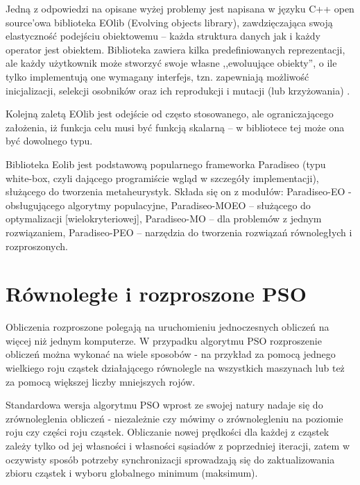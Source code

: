\documentclass[12pt, twoside, openany, abstract=on]{report}
\theoremstyle{definition}
\begin{document}
Jedną z odpowiedzi na opisane wyżej problemy jest napisana w języku C++ open source’owa biblioteka EOlib (Evolving objects library), zawdzięczająca swoją elastyczność podejściu obiektowemu – każda struktura danych jak i każdy operator jest obiektem. Biblioteka zawiera kilka predefiniowanych reprezentacji, ale każdy użytkownik może stworzyć swoje własne ,,ewoluujące obiekty'', o ile tylko implementują one wymagany interfejs, tzn. zapewniają możliwość inicjalizacji, selekcji osobników oraz ich reprodukcji i mutacji (lub krzyżowania) 
. 

Kolejną zaletą EOlib jest odejście od często stosowanego, ale ograniczającego założenia, iż funkcja celu musi być funkcją skalarną – w bibliotece tej może ona być dowolnego typu.

Biblioteka Eolib jest podstawową popularnego frameworka Paradiseo (typu white-box, czyli dającego programiście wgląd w szczegóły implementacji), służącego do tworzenia metaheurystyk.
Składa się on z modułów: Paradiseo-EO -  obsługującego algorytmy populacyjne, Paradiseo-MOEO – służącego do optymalizacji [wielokryteriowej], Paradiseo-MO – dla problemów z jednym rozwiązaniem, Paradiseo-PEO – narzędzia do tworzenia rozwiązań równoległych i rozproszonych.


\section{Równoległe i rozproszone PSO}

Obliczenia rozproszone polegają na uruchomieniu jednoczesnych obliczeń na więcej niż jednym komputerze. W przypadku algorytmu PSO rozproszenie obliczeń można wykonać na wiele sposobów - na przykład za pomocą jednego wielkiego roju cząstek działającego równolegle na wszystkich maszynach lub też za pomocą większej liczby mniejszych rojów.  



Standardowa wersja algorytmu PSO wprost ze swojej natury nadaje się do zrównoleglenia obliczeń - niezależnie czy mówimy o zrównolegleniu na poziomie roju czy części roju cząstek.
Obliczanie nowej prędkości dla każdej z cząstek zależy tylko od jej własności i własności sąsiadów z poprzedniej iteracji, zatem w oczywisty sposób potrzeby synchronizacji sprowadzają się do zaktualizowania zbioru cząstek 
 i wyboru globalnego minimum (maksimum). 
\end{document}
